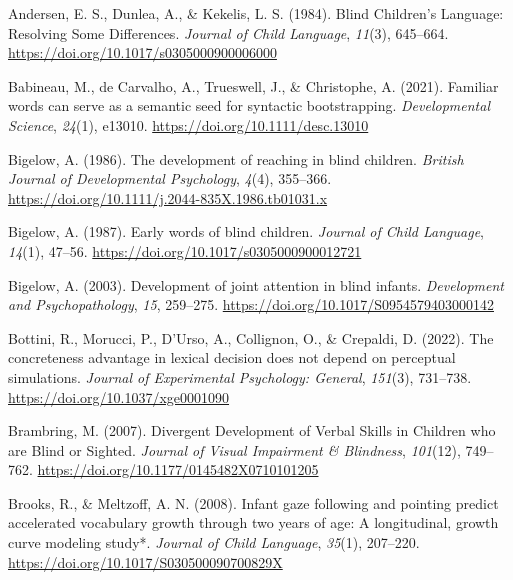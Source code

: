 \documentclass[
  man,floatsintext]{apa6}
\newlength{\cslhangindent}
\newlength{\cslentryspacingunit} %
\newenvironment{CSLReferences}[2] %
 {%
  \setlength{\parindent}{0pt}
  \ifodd #1
  \let\oldpar\par
  \def\par{\hangindent=\cslhangindent\oldpar}
  \fi
  \setlength{\parskip}{#2\cslentryspacingunit}
 }%
 {}
\begin{document}
\hypertarget{refs}{}
\begin{CSLReferences}{1}{0}
\leavevmode{}%
Andersen, E. S., Dunlea, A., \& Kekelis, L. S. (1984). Blind {Children}'s {Language}: {Resolving Some Differences}. \emph{Journal of Child Language}, \emph{11}(3), 645--664. \url{https://doi.org/10.1017/s0305000900006000}

\leavevmode{}%
Babineau, M., de Carvalho, A., Trueswell, J., \& Christophe, A. (2021). Familiar words can serve as a semantic seed for syntactic bootstrapping. \emph{Developmental Science}, \emph{24}(1), e13010. \url{https://doi.org/10.1111/desc.13010}

\leavevmode{}%
Bigelow, A. (1986). The development of reaching in blind children. \emph{British Journal of Developmental Psychology}, \emph{4}(4), 355--366. \url{https://doi.org/10.1111/j.2044-835X.1986.tb01031.x}

\leavevmode{}%
Bigelow, A. (1987). Early words of blind children. \emph{Journal of Child Language}, \emph{14}(1), 47--56. \url{https://doi.org/10.1017/s0305000900012721}

\leavevmode{}%
Bigelow, A. (2003). Development of joint attention in blind infants. \emph{Development and Psychopathology}, \emph{15}, 259--275. \url{https://doi.org/10.1017/S0954579403000142}

\leavevmode{}%
Bottini, R., Morucci, P., D'Urso, A., Collignon, O., \& Crepaldi, D. (2022). The concreteness advantage in lexical decision does not depend on perceptual simulations. \emph{Journal of Experimental Psychology: General}, \emph{151}(3), 731--738. \url{https://doi.org/10.1037/xge0001090}

\leavevmode{}%
Brambring, M. (2007). Divergent {Development} of {Verbal Skills} in {Children} who are {Blind} or {Sighted}. \emph{Journal of Visual Impairment \& Blindness}, \emph{101}(12), 749--762. \url{https://doi.org/10.1177/0145482X0710101205}

\leavevmode{}%
Brooks, R., \& Meltzoff, A. N. (2008). Infant gaze following and pointing predict accelerated vocabulary growth through two years of age: A longitudinal, growth curve modeling study*. \emph{Journal of Child Language}, \emph{35}(1), 207--220. \url{https://doi.org/10.1017/S030500090700829X}


\end{CSLReferences}
\end{document}
